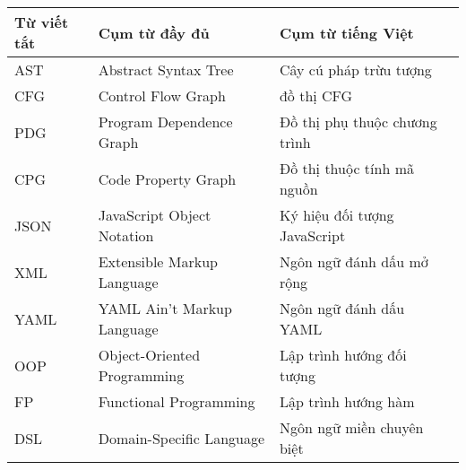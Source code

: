 \begin{table}[h]
\begin{tabularx}{\textwidth}{|l|l|X|X|}
\hline
\textbf{Từ viết tắt} & \textbf{Cụm từ đầy đủ} & \textbf{Cụm từ tiếng Việt} \\
\hline
AST & Abstract Syntax Tree & Cây cú pháp trừu tượng \\
\hline
CFG & Control Flow Graph & đồ thị CFG \\
\hline
PDG & Program Dependence Graph & Đồ thị phụ thuộc chương trình \\
\hline
CPG & Code Property Graph & Đồ thị thuộc tính mã nguồn \\
\hline
JSON & JavaScript Object Notation & Ký hiệu đối tượng JavaScript \\
\hline
XML & Extensible Markup Language & Ngôn ngữ đánh dấu mở rộng \\
\hline
YAML & YAML Ain't Markup Language & Ngôn ngữ đánh dấu YAML \\
\hline
OOP & Object-Oriented Programming & Lập trình hướng đối tượng \\
\hline
FP & Functional Programming & Lập trình hướng hàm \\
\hline
DSL & Domain-Specific Language & Ngôn ngữ miền chuyên biệt \\
\hline
\end{tabularx}
\end{table}